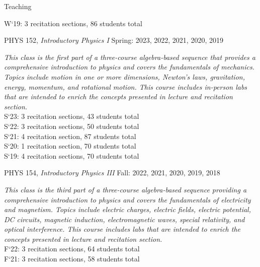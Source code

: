 \documentclass{resume} %
\newcommand{\forceindent}{\leavevmode{\parindent=1em\indent}}
\begin{document}
\begin{rSection}{Teaching}
\begin{description}[leftmargin=2em, style=nextline]
\forceindent \forceindent W`19: 3 recitation sections, 86 students total
\end{description}
\vspace{-0.5em}
\forceindent PHYS 152, \textit{Introductory Physics I}  \hfill {Spring: 2023, 2022, 2021, 2020, 2019}
\begin{description}[leftmargin=2em, style=nextline]
\vspace{-0.5em}
\item[~]\textit{This class is the first part of a three-course algebra-based sequence that provides a comprehensive introduction to physics and covers the fundamentals of mechanics. Topics include motion in one or more dimensions, Newton’s laws, gravitation, energy, momentum, and rotational motion. This course includes in-person labs that are intended to enrich the concepts presented in lecture and recitation section.} \\
\forceindent \forceindent S`23: 3 recitation sections, 43 students total\\
\forceindent \forceindent S`22: 3 recitation sections, 50 students total\\
\forceindent \forceindent S`21: 4 recitation section, 87 students total\\
\forceindent \forceindent S`20: 1 recitation section, 70 students total\\
\forceindent \forceindent S`19: 4 recitation sections, 70 students total
\end{description}
\vspace{-0.5em}
\forceindent PHYS 154, \textit{Introductory Physics III}  \hfill {Fall: 2022, 2021, 2020, 2019, 2018}
\begin{description}[leftmargin=2em, style=nextline]
\vspace{-0.5em}
\item[~]\textit{This class is the third part of a three-course algebra-based sequence providing a comprehensive introduction to physics and covers the fundamentals of electricity and magnetism. Topics include electric charges, electric fields, electric potential, DC circuits, magnetic induction, electromagnetic waves, special relativity, and optical interference. This course includes labs that are intended to enrich the concepts presented in lecture and recitation section.} \\
\forceindent \forceindent F`22: 3 recitation sections, 64 students total\\
\forceindent \forceindent F`21: 3 recitation sections, 58 students total\\

\end{description}
\end{rSection}
\end{document}
